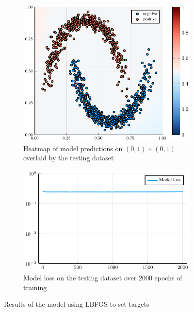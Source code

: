 \begin{figure}
	\centering
	\begin{subfigure}{0.49\textwidth}
		\centering
		\includegraphics[width=\textwidth]{images/lbfgs-heatmap/lbfgs.pdf}
		\caption{Heatmap of model predictions on \( \left( 0, 1 \right) \times \left( 0, 1 \right) \) overlaid by the testing dataset}
	\end{subfigure}
	\begin{subfigure}{0.49\textwidth}
		\centering
		\includegraphics[width=\textwidth]{images/lbfgs-modelloss/lbfgs.pdf}
		\caption{Model loss on the testing dataset over 2000 epochs of training}
	\end{subfigure}
	\caption{Results of the model using LBFGS to set targets}\label{lbfgs}
\end{figure}

